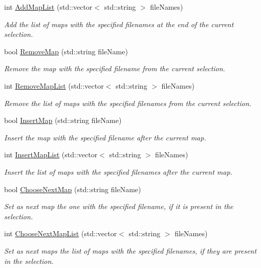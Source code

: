 \begin{DoxyCompactItemize}
int \hyperlink{classMethods_a0b136a5a395e4a50c9f667d9fa495b08}{Add\-Map\-List} (std\-::vector$<$ std\-::string $>$ file\-Names)
\begin{DoxyCompactList}\small\item\em Add the list of maps with the specified filenames at the end of the current selection. \end{DoxyCompactList}\item 
bool \hyperlink{classMethods_a1fd515d35dfc0007303ff75c4f50a678}{Remove\-Map} (std\-::string file\-Name)
\begin{DoxyCompactList}\small\item\em Remove the map with the specified filename from the current selection. \end{DoxyCompactList}\item 
int \hyperlink{classMethods_afbac3687bfc17000689598bff14c7610}{Remove\-Map\-List} (std\-::vector$<$ std\-::string $>$ file\-Names)
\begin{DoxyCompactList}\small\item\em Remove the list of maps with the specified filenames from the current selection. \end{DoxyCompactList}\item 
bool \hyperlink{classMethods_a02eb54d04e3ea1970e5312f0aa061d28}{Insert\-Map} (std\-::string file\-Name)
\begin{DoxyCompactList}\small\item\em Insert the map with the specified filename after the current map. \end{DoxyCompactList}\item 
int \hyperlink{classMethods_a1b5d820d4715a10ab6dbb6bed1b28ec4}{Insert\-Map\-List} (std\-::vector$<$ std\-::string $>$ file\-Names)
\begin{DoxyCompactList}\small\item\em Insert the list of maps with the specified filenames after the current map. \end{DoxyCompactList}\item 
bool \hyperlink{classMethods_a8feb1efefe49126cf39089ff6a2f0cd9}{Choose\-Next\-Map} (std\-::string file\-Name)
\begin{DoxyCompactList}\small\item\em Set as next map the one with the specified filename, if it is present in the selection. \end{DoxyCompactList}\item 
int \hyperlink{classMethods_a7db232616b47d7afa1d3202bf156e624}{Choose\-Next\-Map\-List} (std\-::vector$<$ std\-::string $>$ file\-Names)
\begin{DoxyCompactList}\small\item\em Set as next maps the list of maps with the specified filenames, if they are present in the selection. \end{DoxyCompactList}\end{DoxyCompactItemize}
